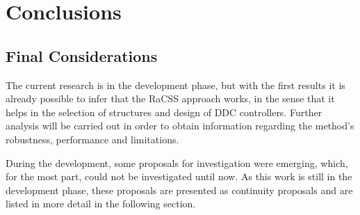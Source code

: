 
\chapter{Conclusions}\label{cap:Concl}
\vspace{-1cm}

%
%



\section{Final Considerations}\label{sec:Cons_finais}

The current research is in the development phase, but with the first results it is already possible to infer that the RaCSS approach works, in the sense that it helps in the selection of structures and design of DDC controllers. Further analysis will be carried out in order to obtain information regarding the method's robustness, performance and limitations.

During the development, some proposals for investigation were emerging, which, for the most part, could not be investigated until now. As this work is still in the development phase, these proposals are presented as continuity proposals and are listed in more detail in the following section.

